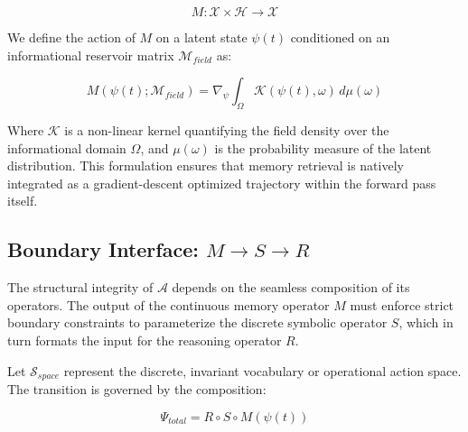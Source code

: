 \begin{equation}
M: \mathcal{X} \times \mathcal{H} \to \mathcal{X}
\end{equation}

We define the action of $M$ on a latent state $\psi(t)$ conditioned on an informational reservoir matrix $\mathcal{M}_{field}$ as:

\begin{equation}
M(\psi(t); \mathcal{M}_{field}) = \nabla_{\psi} \int_{\Omega} \mathcal{K}(\psi(t), \omega) \, d\mu(\omega)
\end{equation}

Where $\mathcal{K}$ is a non-linear kernel quantifying the field density over the informational domain $\Omega$, and $\mu(\omega)$ is the probability measure of the latent distribution. This formulation ensures that memory retrieval is natively integrated as a gradient-descent optimized trajectory within the forward pass itself.

\subsection{\texorpdfstring{Boundary Interface: $M \longrightarrow S \longrightarrow R$}{Boundary Interface: M -> S -> R}}

The structural integrity of $\mathcal{A}$ depends on the seamless composition of its operators. The output of the continuous memory operator $M$ must enforce strict boundary constraints to parameterize the discrete symbolic operator $S$, which in turn formats the input for the reasoning operator $R$. 

Let $\mathcal{S}_{space}$ represent the discrete, invariant vocabulary or operational action space. The transition is governed by the composition:

\begin{equation}
\Psi_{total} = R \circ S \circ M(\psi(t))
\end{equation}

